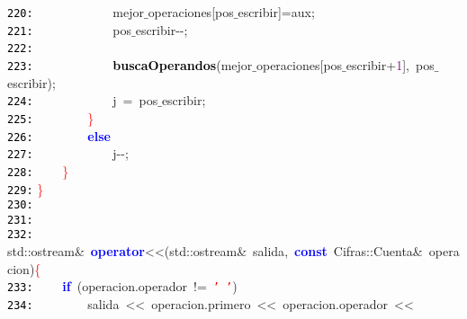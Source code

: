 \documentclass[a4paper,10pt]{scrartcl}
\begin{document}
{   \mbox{}\texttt{\textcolor{Black}{220:}} \ \ \ \ \ \ \ \ \ \ \ \ mejor$\_$operaciones\textcolor{BrickRed}{[}pos$\_$escribir\textcolor{BrickRed}{]=}aux\textcolor{BrickRed}{;} \\
   \mbox{}\texttt{\textcolor{Black}{221:}} \ \ \ \ \ \ \ \ \ \ \ \ pos$\_$escribir\textcolor{BrickRed}{-\/-;} \\
   \mbox{}\texttt{\textcolor{Black}{222:}} \ \ \ \ \ \  \\
   \mbox{}\texttt{\textcolor{Black}{223:}} \ \ \ \ \ \ \ \ \ \ \ \ \textbf{\textcolor{Black}{buscaOperandos}}\textcolor{BrickRed}{(}mejor$\_$operaciones\textcolor{BrickRed}{[}pos$\_$escribir\textcolor{BrickRed}{+}\textcolor{Purple}{1}\textcolor{BrickRed}{],}\ pos$\_$escribir\textcolor{BrickRed}{);} \\
   \mbox{}\texttt{\textcolor{Black}{224:}} \ \ \ \ \ \ \ \ \ \ \ \ j\ \textcolor{BrickRed}{=}\ pos$\_$escribir\textcolor{BrickRed}{;} \\
   \mbox{}\texttt{\textcolor{Black}{225:}} \ \ \ \ \ \ \ \ \textcolor{Red}{\}} \\
   \mbox{}\texttt{\textcolor{Black}{226:}} \ \ \ \ \ \ \ \ \textbf{\textcolor{Blue}{else}} \\
   \mbox{}\texttt{\textcolor{Black}{227:}} \ \ \ \ \ \ \ \ \ \ \ \ j\textcolor{BrickRed}{-\/-;} \\
   \mbox{}\texttt{\textcolor{Black}{228:}} \ \ \ \ \textcolor{Red}{\}} \\
   \mbox{}\texttt{\textcolor{Black}{229:}} \textcolor{Red}{\}} \\
   \mbox{}\texttt{\textcolor{Black}{230:}}  \\
   \mbox{}\texttt{\textcolor{Black}{231:}}  \\
   \mbox{}\texttt{\textcolor{Black}{232:}} std\textcolor{BrickRed}{::}ostream\textcolor{BrickRed}{\&}\ \textbf{\textcolor{Blue}{operator}}\textcolor{BrickRed}{\textless{}\textless{}(}std\textcolor{BrickRed}{::}ostream\textcolor{BrickRed}{\&}\ salida\textcolor{BrickRed}{,}\ \textbf{\textcolor{Blue}{const}}\ Cifras\textcolor{BrickRed}{::}Cuenta\textcolor{BrickRed}{\&}\ operacion\textcolor{BrickRed}{)}\textcolor{Red}{\{} \\
   \mbox{}\texttt{\textcolor{Black}{233:}} \ \ \ \ \textbf{\textcolor{Blue}{if}}\ \textcolor{BrickRed}{(}operacion\textcolor{BrickRed}{.}operador\ \textcolor{BrickRed}{!=}\ \texttt{\textcolor{Red}{'\ '}}\textcolor{BrickRed}{)} \\
   \mbox{}\texttt{\textcolor{Black}{234:}} \ \ \ \ \ \ \ \ salida\ \textcolor{BrickRed}{\textless{}\textless{}}\ operacion\textcolor{BrickRed}{.}primero\ \textcolor{BrickRed}{\textless{}\textless{}}\ operacion\textcolor{BrickRed}{.}operador\ \textcolor{BrickRed}{\textless{}\textless{}} \\
}
\end{document}
